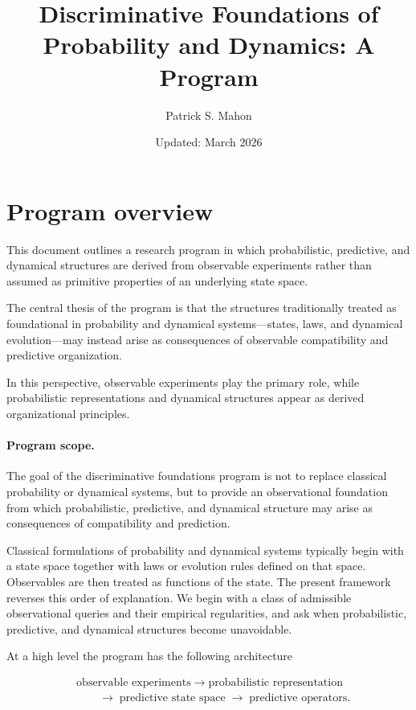 \documentclass[11pt]{article}
\title{Discriminative Foundations of Probability and Dynamics: A Program}
\author{Patrick S. Mahon}
\date{Updated: March 2026}
\begin{document}
\maketitle


\section{Program overview}

This document outlines a research program in which probabilistic,
predictive, and dynamical structures are derived from observable
experiments rather than assumed as primitive properties of an
underlying state space.

The central thesis of the program is that the structures traditionally
treated as foundational in probability and dynamical systems—states,
laws, and dynamical evolution—may instead arise as consequences of
observable compatibility and predictive organization.

In this perspective, observable experiments play the primary role,
while probabilistic representations and dynamical structures appear as
derived organizational principles.

\paragraph{Program scope.}
The goal of the discriminative foundations program is not to replace
classical probability or dynamical systems, but to provide an
observational foundation from which probabilistic, predictive, and
dynamical structure may arise as consequences of compatibility and
prediction.

Classical formulations of probability and dynamical systems typically
begin with a state space together with laws or evolution rules
defined on that space.  Observables are then treated as functions of
the state.  The present framework reverses this order of explanation.
We begin with a class of admissible observational queries and their
empirical regularities, and ask when probabilistic, predictive, and
dynamical structures become unavoidable.

At a high level the program has the following architecture

\begin{align*}
&\text{observable experiments}
\;\longrightarrow\;
\text{probabilistic representation}\\
&\qquad\longrightarrow\;
\text{predictive state space}
\;\longrightarrow\;
\text{predictive operators}.
\end{align*}
\end{document}
